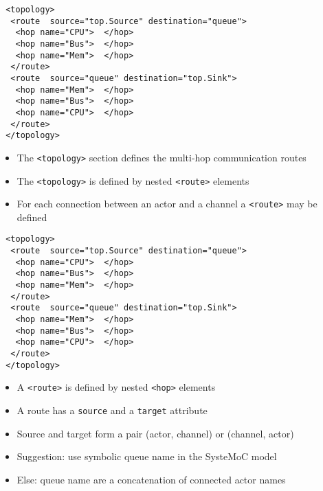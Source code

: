 \begin{frame}[fragile=singleslide]
\begin{lstlisting}
 <topology>
  <route  source="top.Source" destination="queue">
   <hop name="CPU">  </hop>
   <hop name="Bus">  </hop>
   <hop name="Mem">  </hop>
  </route>
  <route  source="queue" destination="top.Sink">
   <hop name="Mem">  </hop>
   <hop name="Bus">  </hop>
   <hop name="CPU">  </hop>
  </route>
 </topology>
\end{lstlisting}
\begin{itemize}
\item The  \lstinline!<topology>! section defines the multi-hop communication routes
\item The \lstinline!<topology>! is defined by nested \lstinline!<route>! elements
\item For each connection between an actor and a channel a  \lstinline!<route>! may be defined
\end{itemize}
\end{frame}


\begin{frame}[fragile=singleslide]
\begin{lstlisting}
 <topology>
  <route  source="top.Source" destination="queue">
   <hop name="CPU">  </hop>
   <hop name="Bus">  </hop>
   <hop name="Mem">  </hop>
  </route>
  <route  source="queue" destination="top.Sink">
   <hop name="Mem">  </hop>
   <hop name="Bus">  </hop>
   <hop name="CPU">  </hop>
  </route>
 </topology>
\end{lstlisting}
\begin{itemize}
\item A \lstinline!<route>! is defined by nested \lstinline!<hop>! elements
\item A route has a \lstinline!source! and a \lstinline!target! attribute
\item Source and target form a pair (actor, channel) or (channel, actor)
\item Suggestion: use symbolic queue name in the SysteMoC model
\item Else: queue name are a concatenation of connected actor names
\end{itemize}
\end{frame}


